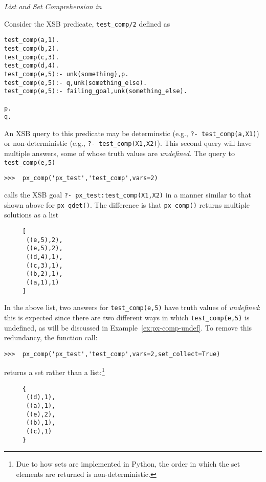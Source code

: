 \begin{example} \rm {\it List and Set Comprehension in \px{}} \label{ex:list-comp-1}

  Consider the XSB predicate, {\tt test\_comp/2} defined as

{\small  
\begin{verbatim}  
test_comp(a,1).
test_comp(b,2).
test_comp(c,3).
test_comp(d,4).
test_comp(e,5):- unk(something),p.
test_comp(e,5):- q,unk(something_else).
test_comp(e,5):- failing_goal,unk(something_else).

p.
q.
\end{verbatim}
}

\noindent
An XSB query to this predicate may be determinstic (e.g., {\tt ?-
  test\_comp(a,X1)}) or non-deterministic (e.g., {\tt ?-
  test\_comp(X1,X2)}).  This second query will have multiple answers,
some of whose truth values are {\em undefined}.  The \px{} query to
{\tt test\_comp(e,5)}

\begin{verbatim}
>>>  px_comp('px_test','test_comp',vars=2)
\end{verbatim}

\noindent
calls the XSB goal {\tt ?- px\_test:test\_comp(X1,X2)} in a manner
similar to that shown above for {\tt px\_qdet()}.  The difference is
that {\tt px\_comp()} returns multiple solutions as a list

{\small  
\begin{verbatim}
     [
      ((e,5),2),
      ((e,5),2),
      ((d,4),1),
      ((c,3),1),
      ((b,2),1),
      ((a,1),1) 
     ]
\end{verbatim}
}

\noindent
In the above list, two answers for {\tt test\_comp(e,5)} have truth
values of {\em undefined}: this is expected since there are two
different ways in which {\tt test\_comp(e,5)} is undefined, as will be
discussed in Example~\ref{ex:px-comp-undef}.  To remove this
redundancy, the function call:

\begin{verbatim}
>>>  px_comp('px_test','test_comp',vars=2,set_collect=True)
\end{verbatim}

\noindent
returns a set rather than a list:\footnote{Due to how sets are
  implemented in Python, the order in which the set elements are
  returned is non-deterministic.}

{\small  
\begin{verbatim}
     {
      ((d),1),
      ((a),1),
      ((e),2),
      ((b),1),
      ((c),1) 
     }
\end{verbatim}
}


\end{example}
